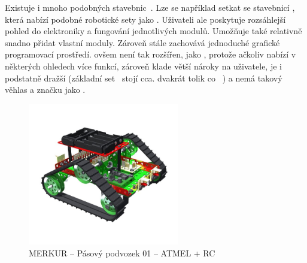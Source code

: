 
Existuje i mnoho podobných stavebnic~\cite{intorobotics_BestAlternativesToLegoMindstormsKits}. 
Lze se například setkat se stavebnicí \fischerT, která nabízí podobné robotické sety jako \lego{~}\cite{fischertechnik_ROBOTICS}. 
Uživateli ale poskytuje rozsáhlejší pohled do elektroniky a fungování jednotlivých modulů. 
Umožňuje také relativně snadno přidat vlastní moduly.
Zároveň stále zachovává jednoduché grafické programovací prostředí. 
\FischerT{ }ovšem není tak rozšířen, jako \legoM, protože ačkoliv nabízí v některých ohledech více funkcí, zároveň klade větší nároky na uživatele, je i podstatně dražší (základní set~\cite{fischertechnik_HelagoEshop_ROBOTICS-TXT-COMPETITION-SET} stojí cca. dvakrát tolik co ~\cite{lego_eduxeEshop_CoreSet}) a nemá takový věhlas a značku jako \lego.



\begin{figure}[h]
 	\centering
	\includegraphics[width=250px]{images/MERKUR_Pasovy-podvozek-01_ATMEL+RC.jpg}
		\caption[MERKUR -- Pásový podvozek 01 -- ATMEL + RC]{MERKUR -- Pásový podvozek 01 -- ATMEL + RC\protect\footnotemark}
	\label{fig:MERKUR_Pasovy-podvozek-01_ATMEL+RC}
\end{figure}

